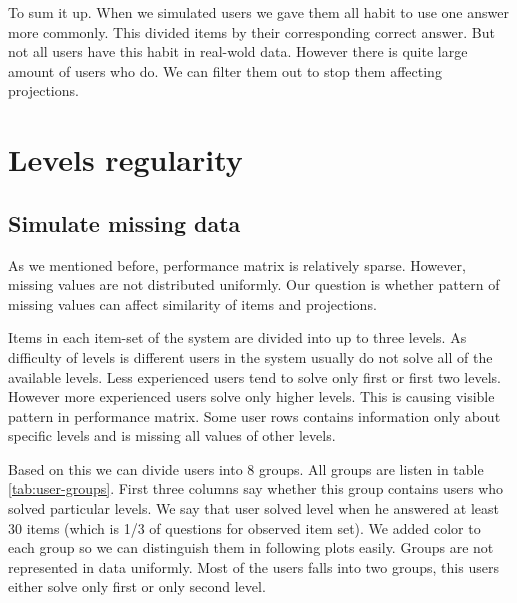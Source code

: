 \documentclass[
  digital, %
  table,   %
  nolof,     %
  nolot,     %
  nocover
]{fithesis3}
\begin{document}


To sum it up. When we simulated users we gave them all habit to use one answer more
commonly. This divided items by their corresponding correct answer. But not all users have this habit in real-wold data. However
there is quite large amount of users who do. We can filter them out to stop them affecting projections.


\section{Levels regularity}


\subsection{Simulate missing data}




As we mentioned before, performance matrix is relatively sparse. However, missing values are not distributed uniformly. Our question is whether pattern of missing values can affect similarity of items and projections.


Items in each item-set of the system are divided into up to three levels. As difficulty of levels is different users in the system usually do not solve all of the available levels. Less experienced users tend to solve only first or first two levels. However more experienced users solve only higher levels. This is causing visible pattern in performance matrix. Some user rows contains information only about specific levels and is missing all values of other levels.


Based on this we can divide users into 8 groups. All groups are listen in table \ref{tab:user-groups}. First three columns say whether this group contains users who solved particular levels. We say that user solved level when he answered at least 30 items (which is 1/3 of questions for observed item set). We added color to each group so we can distinguish them in following plots easily. Groups are not represented in data uniformly. Most of the users falls into two groups, this users either solve only first or only second level.
\end{document}
